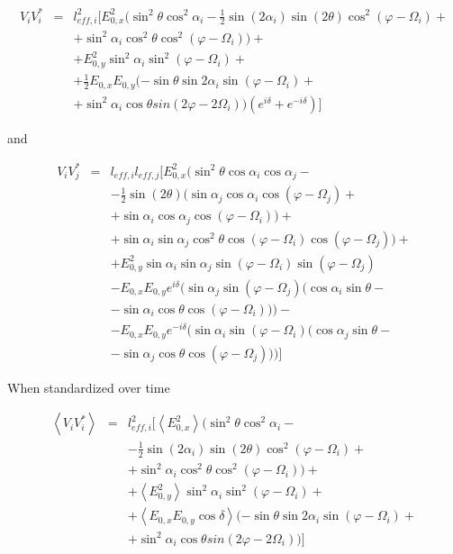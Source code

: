 \documentclass[a4paper,11pt]{report}
\begin{document}
\begin{eqnarray}
V_i V_i^{*} &=& l_{eff,i}^2[E_{0,x}^2 (\sin^2 \theta \cos^2 \alpha_i -\frac{1}{2} \sin (2\alpha_i) \sin(2\theta) \cos^2(\varphi - \Omega_i) + \nonumber \\
& & + \sin^2\alpha_i \cos^2\theta \cos^2(\varphi - \Omega_i))+ \\
& & + E_{0,y}^2 \sin^2\alpha_i \sin^2 (\varphi - \Omega_i) +\nonumber \\
& & +  \frac{1}{2} E_{0,x} E_{0,y} (-\sin \theta \sin 2\alpha_i \sin(\varphi - \Omega_i) + \nonumber \\
&&+\sin^2\alpha_i \cos \theta sin(2\varphi - 2\Omega_i)) (e^{i \delta} + e^{-i \delta } )]\nonumber
\end{eqnarray}

and

\begin{eqnarray}
V_i V_j^{*} &=& l_{eff,i} l_{eff,j}[E_{0,x}^2 (\sin^2 \theta \cos \alpha_i \cos \alpha_j - \\
& & - \frac{1}{2}  \sin(2\theta) (\sin \alpha_j \cos \alpha_i \cos(\varphi - \Omega_j)+ \nonumber \\
& & +\sin \alpha_i \cos \alpha_j \cos(\varphi - \Omega_i) )+ \nonumber \\
& & + \sin \alpha_i \sin \alpha_j \cos^2\theta \cos(\varphi - \Omega_i) \cos(\varphi - \Omega_j))+ \nonumber \\
& & + E_{0,y}^2 \sin \alpha_i \sin \alpha_j \sin (\varphi - \Omega_i) \sin (\varphi - \Omega_j)\nonumber \\
& & -E_{0,x} E_{0,y} e^{i \delta}( \sin \alpha_j \sin(\varphi - \Omega_j)( \cos \alpha_i \sin \theta - \nonumber \\
& &- \sin \alpha_i \cos \theta \cos(\varphi - \Omega_i)))-\nonumber \\
& &  -E_{0,x} E_{0,y} e^{-i \delta}( \sin \alpha_i \sin(\varphi - \Omega_i)( \cos \alpha_j \sin \theta - \nonumber \\
& & -\sin \alpha_j \cos \theta \cos(\varphi - \Omega_j)))]\nonumber
\end{eqnarray}

When standardized over time

\begin{eqnarray}
\left\langle V_i V_i^{*} \right\rangle &=&  l_{eff,i}^2[\left\langle E_{0,x}^2\right\rangle (\sin^2 \theta \cos^2 \alpha_i -\nonumber\\
& & -\frac{1}{2} \sin (2\alpha_i) \sin(2\theta) \cos^2(\varphi - \Omega_i) + \\
& & + \sin^2\alpha_i \cos^2\theta \cos^2(\varphi - \Omega_i))+ \nonumber \\
& & + \left\langle E_{0,y}^2 \right\rangle \sin^2\alpha_i \sin^2 (\varphi - \Omega_i)+ \nonumber \\
& & +  \left\langle E_{0,x} E_{0,y} \cos \delta \right\rangle (-\sin \theta \sin 2\alpha_i \sin(\varphi - \Omega_i) + \nonumber \\
& &+ \sin^2\alpha_i \cos \theta sin(2\varphi - 2\Omega_i)) ]\nonumber
\end{eqnarray}
\end{document}

